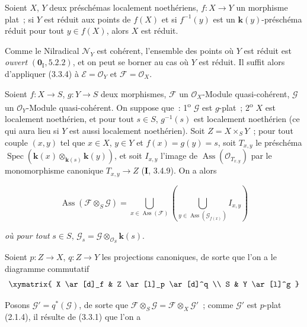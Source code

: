 \begin{corollary}[3.3.5]
\label{IV.2.3.3.5-fr}
Soient $X$, $Y$ deux préschémas localement noethériens, $f:X\to Y$ un
morphisme plat~; si $Y$ est réduit aux points de $f(X)$ et si $f^{-1}(y)$ est
un $\boldsymbol{k}(y)$-préschéma réduit pour tout $y\in f(X)$, alors $X$ est réduit.
\end{corollary}

Comme le Nilradical $\mathcal N_Y$ est cohérent, l'ensemble des points où $Y$
est réduit est \emph{ouvert} $(\mathbf{0}_{\mathrm I},5.2.2)$, et on peut se borner au
cas où $Y$ est réduit. Il suffit alors d'appliquer (3.3.4) à
$\mathcal E=\mathcal O_Y$ et $\mathcal F=\mathcal O_X$.

\begin{proposition}[3.3.6]
\label{IV.2.3.3.6-fr}
Soient $f:X\to S$, $g:Y\to S$ deux morphismes, $\mathcal F$ un
$\mathcal O_X$-Module quasi-cohérent, $\mathcal G$ un $\mathcal O_Y$-Module
quasi-cohérent. On suppose que~: 1\textsuperscript{o} $\mathcal G$ est
$g$-plat~; 2\textsuperscript{o} $X$ est localement noethérien, et pour tout
$s\in S$, $g^{-1}(s)$ est localement noethérien (ce qui aura lieu si $Y$ est
aussi localement noethérien). Soit $Z=X\times_S Y$~; pour tout couple $(x,y)$
tel que $x\in X$, $y\in Y$ et
$f(x)=g(y)=s$, soit $T_{x,y}$ le préschéma
$\operatorname{Spec}(\boldsymbol{k}(x)\otimes_{\mathbf{k}(s)}\boldsymbol{k}(y))$, et soit $I_{x,y}$ l'image de
$\operatorname{Ass}(\mathcal O_{T_{x,y}})$ par le monomorphisme canonique
$T_{x,y}\to Z$ \textup{(\textbf{I}, 3.4.9)}. On a alors
\end{proposition}

\begin{env}[3.3.6.1]
\label{IV.2.3.3.6.1-fr}
\[
\operatorname{Ass}(\mathcal F\otimes_S\mathcal G)
=\bigcup_{x\in\operatorname{Ass}(\mathcal F)}
\left(\bigcup_{y\in\operatorname{Ass}(\mathcal G_{f(x)})}I_{x,y}\right)
\]
\end{env}

\textit{où pour tout} $s\in S$, $\mathcal G_s=\mathcal G\otimes_{\mathcal O_S}\boldsymbol{k}(s)$.

Soient $p:Z\to X$, $q:Z\to Y$ les projections canoniques, de sorte que l'on
a le diagramme commutatif
\[
\xymatrix{
X \ar[d]_f & Z \ar[l]_p \ar[d]^q \\
S & Y \ar[l]^g
}
\]

Posons $\mathcal G'=q^*(\mathcal G)$, de sorte que
$\mathcal F\otimes_S\mathcal G=\mathcal F\otimes_X\mathcal G'$~; comme
$\mathcal G'$ est $p$-plat (2.1.4), il résulte de (3.3.1) que l'on a

